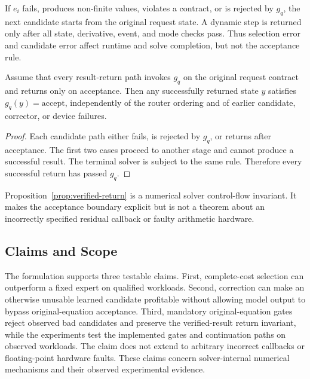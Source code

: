 If $e_i$ fails, produces non-finite values, violates a contract, or is rejected by
$g_q$, the next candidate starts from the original request state. A dynamic step is
returned only after all state, derivative, event, and mode checks pass. Thus selection
error and candidate error affect runtime and solve completion, but not the acceptance rule.

\begin{proposition}
\label{prop:verified-return}
Assume that every result-return path invokes $g_q$ on the original request contract
and returns only on acceptance. Then any successfully returned state $y$ satisfies
$g_q(y)=\mathrm{accept}$, independently of the router ordering and of earlier
candidate, corrector, or device failures.
\end{proposition}

\begin{proof}
Each candidate path either fails, is rejected by $g_q$, or returns after acceptance.
The first two cases proceed to another stage and cannot produce a successful result.
The terminal solver is subject to the same rule. Therefore every successful return
has passed $g_q$.
\end{proof}

Proposition~\ref{prop:verified-return} is a numerical solver control-flow
invariant. It makes the acceptance boundary explicit but is not a theorem about an
incorrectly specified residual callback or faulty arithmetic hardware.

\subsection{Claims and Scope}

The formulation supports three testable claims. First, complete-cost selection can
outperform a fixed expert on qualified workloads. Second, correction can make an
otherwise unusable learned candidate profitable without allowing model output to
bypass original-equation acceptance. Third, mandatory original-equation gates reject observed bad
candidates and preserve the verified-result return invariant, while the experiments test
the implemented gates and continuation paths on observed workloads. The claim does not extend
to arbitrary incorrect callbacks or floating-point hardware faults. These claims concern
solver-internal numerical mechanisms and their observed experimental evidence.
